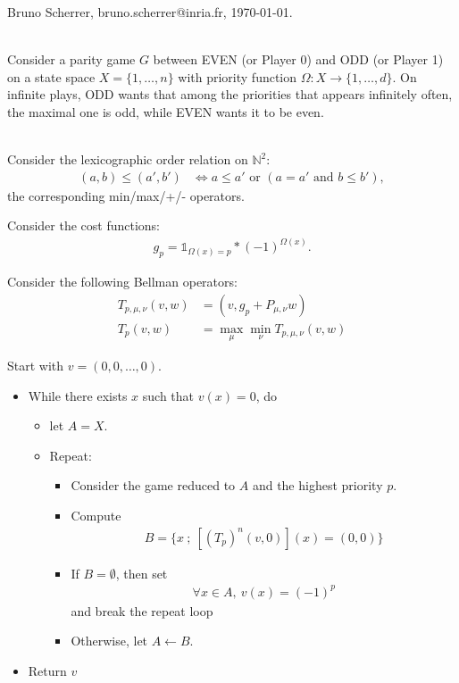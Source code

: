 \documentclass{article}
\def\1{{\mathds 1}}
\def\N{\mathbb N}
\begin{document}
\noindent Bruno Scherrer, bruno.scherrer@inria.fr, \today.

~\\

Consider a parity game $G$ between EVEN (or Player 0) and ODD (or Player 1) on a state space $X=\{1,\dots,n\}$ with priority function $\Omega:X \to \{1,\dots,d\}$. On infinite plays, ODD wants that among the priorities that appears infinitely often, the maximal one is odd, while EVEN wants it to be even.

~ \\

Consider the lexicographic order relation on $\N^2$:
\begin{align}
  (a,b) \le (a',b') & \Leftrightarrow a \le a' \mbox{ or }(a=a' \mbox{ and }b \le b' ),
\end{align}
the corresponding min/max/+/- operators.

Consider the cost functions:
\begin{align}
  g_p = \1_{\Omega(x)=p}*(-1)^{\Omega(x)}.
\end{align}

Consider the following Bellman operators:
\begin{align}
  T_{p,\mu,\nu} (v,w) &= (v, g_p + P_{\mu,\nu} w )\\
  T_{p}(v,w) &= \max_\mu \min_\nu T_{p,\mu,\nu}(v,w)
\end{align}

Start with $v=(0,0,\dots,0)$.
\begin{itemize}
\item While there exists $x$ such that $v(x)=0$, do
  \begin{itemize}
    \item let $A=X$.
    \item Repeat:
      \begin{itemize}
      \item Consider the game reduced to $A$ and the highest priority $p$.
      \item Compute
        \begin{align}
          B = \{x ~;~ [(T_p)^n(v,0)](x)=(0,0) \}
        \end{align}
      \item If $B=\emptyset$, then set
        \begin{align}
          \forall x \in A,~ v(x)=(-1)^p
        \end{align}
        and break the repeat loop
      \item Otherwise, let $A \leftarrow B$.
      \end{itemize}
  \end{itemize}
\item Return $v$
\end{itemize}
\end{document}
